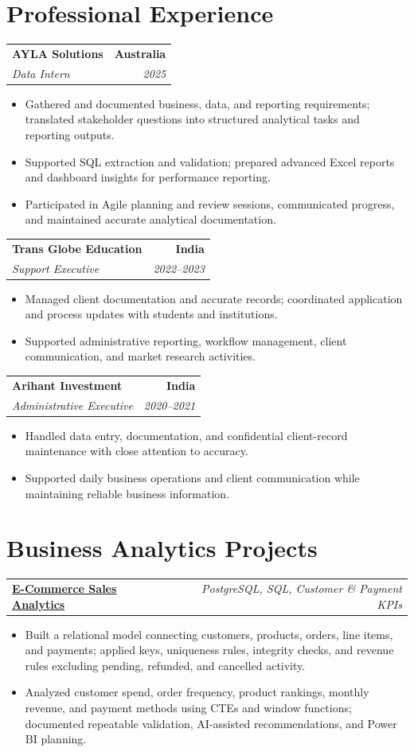 \documentclass[letterpaper,10pt]{article}
\makeatletter
\newcommand{\role}[4]{%
  \begin{tabularx}{\textwidth}{@{}Xr@{}}
    \textbf{#1} & \textbf{#2} \\
    \textit{#3} & \textit{#4}
  \end{tabularx}\vspace{-1pt}
}
\newcommand{\project}[2]{%
  \begin{tabularx}{\textwidth}{@{}Xr@{}}
    \textbf{#1} & \textit{#2}
  \end{tabularx}\vspace{-1pt}
}
\makeatother
\begin{document}
\section{Professional Experience}
\role{AYLA Solutions}{Australia}{Data Intern}{2025}
\begin{itemize}
  \item Gathered and documented business, data, and reporting requirements; translated stakeholder questions into structured analytical tasks and reporting outputs.
  \item Supported SQL extraction and validation; prepared advanced Excel reports and dashboard insights for performance reporting.
  \item Participated in Agile planning and review sessions, communicated progress, and maintained accurate analytical documentation.
\end{itemize}
\vspace{1pt}

\role{Trans Globe Education}{India}{Support Executive}{2022--2023}
\begin{itemize}
  \item Managed client documentation and accurate records; coordinated application and process updates with students and institutions.
  \item Supported administrative reporting, workflow management, client communication, and market research activities.
\end{itemize}
\vspace{1pt}

\role{Arihant Investment}{India}{Administrative Executive}{2020--2021}
\begin{itemize}
  \item Handled data entry, documentation, and confidential client-record maintenance with close attention to accuracy.
  \item Supported daily business operations and client communication while maintaining reliable business information.
\end{itemize}

\section{Business Analytics Projects}
\project{\href{https://github.com/jainalimehta/Ecommerce-Sales-Analytics}{E-Commerce Sales Analytics}}{PostgreSQL, SQL, Customer \& Payment KPIs}
\begin{itemize}
  \item Built a relational model connecting customers, products, orders, line items, and payments; applied keys, uniqueness rules, integrity checks, and revenue rules excluding pending, refunded, and cancelled activity.
  \item Analyzed customer spend, order frequency, product rankings, monthly revenue, and payment methods using CTEs and window functions; documented repeatable validation, AI-assisted recommendations, and Power BI planning.
\end{itemize}
\vspace{1pt}
\end{document}
